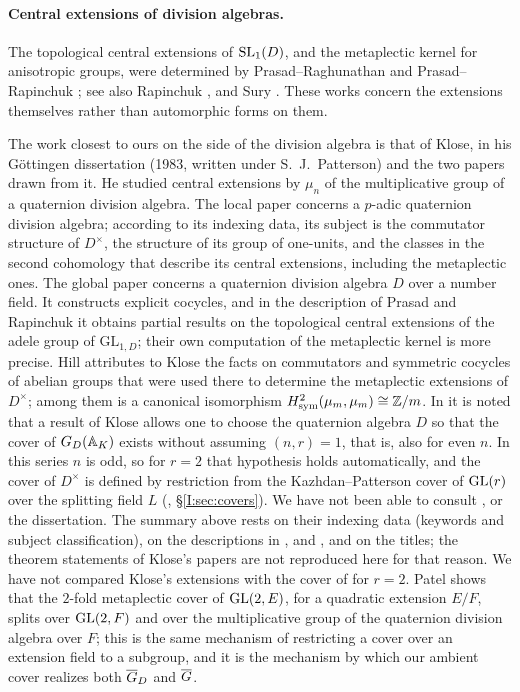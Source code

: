 \paragraph{Central extensions of division algebras.} The topological central extensions of $\mathrm{SL}_1(D)$, and the metaplectic kernel for anisotropic groups, were determined by Prasad--Raghunathan \cite{PR88} and Prasad--Rapinchuk \cite{PR96}; see also Rapinchuk \cite{Rap86}, \cite{Rap88} and Sury \cite{Sur05}. These works concern the extensions themselves rather than automorphic forms on them.

The work closest to ours on the side of the division algebra is that of Klose, in his G\"ottingen dissertation (1983, written under S.~J.~Patterson) and the two papers drawn from it. He studied central extensions by $\mu_n$ of the multiplicative group of a quaternion division algebra. The local paper \cite{Klo86a} concerns a $p$-adic quaternion division algebra; according to its indexing data, its subject is the commutator structure of $D^\times$, the structure of its group of one-units, and the classes in the second cohomology that describe its central extensions, including the metaplectic ones. The global paper \cite{Klo86b} concerns a quaternion division algebra $D$ over a number field. It constructs explicit cocycles, and in the description of Prasad and Rapinchuk \cite[Introduction]{PR96} it obtains partial results on the topological central extensions of the adele group of $\mathrm{GL}_{1,D}$; their own computation of the metaplectic kernel is more precise. Hill \cite[\S\S2.3, 3.8]{Hil08} attributes to Klose the facts on commutators and symmetric cocycles of abelian groups that were used there to determine the metaplectic extensions of $D^\times$; among them is a canonical isomorphism $H^2_{\mathrm{sym}}(\mu_m,\mu_m)\cong\mathbb Z/m$. In \cite{Jo88} it is noted that a result of Klose allows one to choose the quaternion algebra $D$ so that the cover of $G_D(\mathbb A_K)$ exists without assuming $(n,r)=1$, that is, also for even $n$. In this series $n$ is odd, so for $r=2$ that hypothesis holds automatically, and the cover of $D^\times$ is defined by restriction from the Kazhdan--Patterson cover of $\operatorname{GL}(r)$ over the splitting field $L$ (\cite{JC26a}, \S\ref{I:sec:covers}). We have not been able to consult \cite{Klo86a}, \cite{Klo86b} or the dissertation. The summary above rests on their indexing data (keywords and subject classification), on the descriptions in \cite{PR96}, \cite{Hil08} and \cite{Jo88}, and on the titles; the theorem statements of Klose's papers are not reproduced here for that reason. We have not compared Klose's extensions with the cover of \cite{JC26a} for $r=2$. Patel \cite{Pat14} shows that the $2$-fold metaplectic cover of $\operatorname{GL}(2,E)$, for a quadratic extension $E/F$, splits over $\operatorname{GL}(2,F)$ and over the multiplicative group of the quaternion division algebra over $F$; this is the same mechanism of restricting a cover over an extension field to a subgroup, and it is the mechanism by which our ambient cover realizes both $\overline{G}_D$ and $\overline{G}$.

